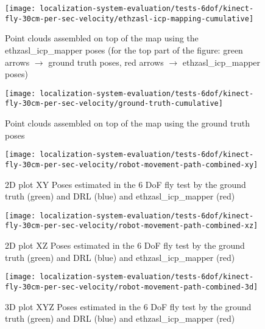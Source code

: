 \begin{figure}[H]
	\centering
	\texttt{[image: localization-system-evaluation/tests-6dof/kinect-fly-30cm-per-sec-velocity/ethzasl-icp-mapping-cumulative]}
	\caption{Point clouds assembled on top of the map using the ethzasl\_icp\_mapper poses (for the top part of the figure: green arrows $\rightarrow$ ground truth poses, red arrows $\rightarrow$ ethzasl\_icp\_mapper poses)}
	\label{fig:localization-system-evaluation_kinect-fly-30cm-per-sec-velocity-ethzasl-icp-mapping-cumulative}
\end{figure}

\begin{figure}[H]
	\centering
	\texttt{[image: localization-system-evaluation/tests-6dof/kinect-fly-30cm-per-sec-velocity/ground-truth-cumulative]}
	\caption{Point clouds assembled on top of the map using the ground truth poses}
	\label{fig:localization-system-evaluation_kinect-fly-30cm-per-sec-velocity-gt-cumulative}
\end{figure}


\begin{figure}[H]
	\centering
	\texttt{[image: localization-system-evaluation/tests-6dof/kinect-fly-30cm-per-sec-velocity/robot-movement-path-combined-xy]}
	\caption{2D plot XY Poses estimated in the 6 DoF fly test by the ground truth (green) and DRL (blue) and ethzasl\_icp\_mapper (red)}
	\label{fig:localization-system-evaluation_kinect-fly-robot-movement-path-combined-xy}
\end{figure}

\begin{figure}[H]
	\centering
	\texttt{[image: localization-system-evaluation/tests-6dof/kinect-fly-30cm-per-sec-velocity/robot-movement-path-combined-xz]}
	\caption{2D plot XZ Poses estimated in the 6 DoF fly test by the ground truth (green) and DRL (blue) and ethzasl\_icp\_mapper (red)}
	\label{fig:localization-system-evaluation_kinect-fly-robot-movement-path-combined-xz}
\end{figure}

\begin{figure}[H]
	\centering
	\texttt{[image: localization-system-evaluation/tests-6dof/kinect-fly-30cm-per-sec-velocity/robot-movement-path-combined-3d]}
	\caption{3D plot XYZ Poses estimated in the 6 DoF fly test by the ground truth (green) and DRL (blue) and ethzasl\_icp\_mapper (red)}
	\label{fig:localization-system-evaluation_kinect-fly-robot-movement-path-combined-3d}
\end{figure}



